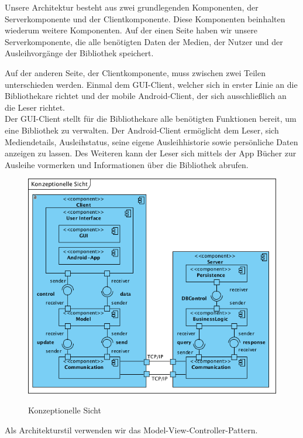 \documentclass[fontsize=12pt,paper=a4,twoside]{scrartcl}
\begin{document}
Unsere Architektur besteht aus zwei grundlegenden Komponenten, der Serverkomponente und der Clientkomponente. Diese Komponenten beinhalten wiederum weitere Komponenten. Auf der einen Seite haben wir unsere Serverkomponente, die alle benötigten Daten der Medien, der Nutzer und der Ausleihvorgänge der Bibliothek speichert.

Auf der anderen Seite, der Clientkomponente, muss zwischen zwei Teilen unterschieden werden. Einmal dem GUI-Client, welcher sich in erster Linie an die Bibliothekare richtet und der mobile Android-Client, der sich ausschließlich an die Leser richtet. \\
Der GUI-Client stellt für die Bibliothekare alle benötigten Funktionen bereit, um eine Bibliothek zu verwalten. Der Android-Client ermöglicht dem Leser, sich Mediendetails, Ausleihstatus, seine eigene Ausleihhistorie sowie persönliche Daten anzeigen zu lassen. Des Weiteren kann der Leser sich mittels der App Bücher zur Ausleihe vormerken und Informationen über die Bibliothek abrufen.

\begin{figure} [H] 
\caption{Konzeptionelle Sicht}  \centering
	\includegraphics[width=1\textwidth]{Diagramme/KonzeptionelleSicht.png} 
	\label{pic:konzeptionellesicht} 
\end{figure}

{\centering Als Architekturstil verwenden wir das Model-View-Controller-Pattern.\\}
\end{document}
